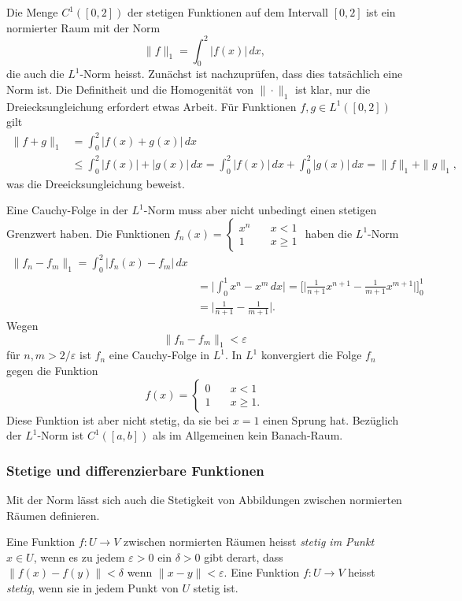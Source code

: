 \begin{beispiel}
Die Menge $C^1([0,2])$
der stetigen Funktionen auf dem Intervall $[0,2]$ ist ein normierter
Raum mit der Norm
\[
\|f\|_1
=
\int_0^2 |f(x)|\,dx,
\]
die auch die $L^1$-Norm heisst.
%
Zunächst ist nachzuprüfen, dass dies tatsächlich eine Norm ist.
Die Definitheit und die Homogenität von $\|\cdot\|_1$ ist klar, nur
die Dreiecksungleichung erfordert etwas Arbeit.
Für Funktionen $f,g\in L^1([0,2])$ gilt
\begin{align*}
\|f+g\|_1
&=
\int_0^2 |f(x)+g(x)|\,dx
\\
&\le 
\int_0^2 |f(x)|+|g(x)|\,dx
=
\int_0^2 |f(x)|\,dx
+
\int_0^2 |g(x)|\,dx
=
\|f\|_1+\|g\|_1,
\end{align*}
was die Dreeicksungleichung beweist.

Eine Cauchy-Folge in der $L^1$-Norm muss aber nicht unbedingt einen
stetigen Grenzwert haben.
Die Funktionen
\(
f_n(x) =
\begin{cases}
x^n&\quad x< 1\\
1&\quad x\ge 1
\end{cases}
\)
haben die $L^1$-Norm
\begin{align*}
\|f_n-f_m\|_1
=
\int_0^2 |f_n(x)-f_m|\,dx
\\
&=
\biggl|\int_0^1 x^n-x^m\,dx\biggr|
=
\biggl[
\biggl|
\frac{1}{n+1}x^{n+1}
-
\frac{1}{m+1}x^{m+1}
\biggr|
\biggr]_0^1
\\
&=
\biggl|
\frac{1}{n+1}
-
\frac{1}{m+1}\biggr|.
\end{align*}
Wegen
\[
\|f_n-f_m\|_1
<\varepsilon
\]
für $n,m>2/\varepsilon$ ist $f_n$ eine Cauchy-Folge in $L^1$.
In $L^1$ konvergiert die Folge $f_n$ gegen die Funktion
\[
f(x)
=
\begin{cases}
0&\quad x< 1\\
1&\quad x\ge 1.
\end{cases}
\]
Diese Funktion ist aber nicht stetig, da sie bei $x=1$ einen
Sprung hat.
Bezüglich der $L^1$-Norm ist $C^1([a,b])$ als im Allgemeinen
kein Banach-Raum.
\end{beispiel}

%
%
\subsubsection{Stetige und differenzierbare Funktionen}
Mit der Norm lässt sich auch die Stetigkeit von Abbildungen zwischen
normierten Räumen definieren.

\begin{definition}[Stetigkeit]
Eine Funktion $f\colon U\to V$ zwischen normierten Räumen heisst
{\em stetig im Punkt} $x\in U$, wenn es zu jedem $\varepsilon > 0$
%
ein $\delta > 0$
gibt derart, dass
\(
\|f(x)-f(y)\| < \delta
\)
wenn
\(
\|x-y\|<\varepsilon
\).
Eine Funktion $f\colon U\to V$ heisst {\em stetig}, wenn sie in
jedem Punkt von $U$ stetig ist.
\end{definition}

